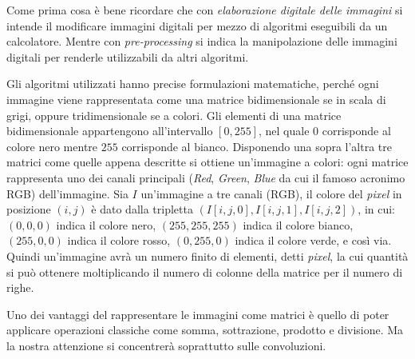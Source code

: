 Come prima cosa è bene ricordare che con \textit{elaborazione digitale delle immagini} si intende il modificare immagini digitali per mezzo di algoritmi eseguibili da un calcolatore.
Mentre con \textit{pre-processing} si indica la manipolazione delle immagini digitali per renderle utilizzabili da altri algoritmi.

Gli algoritmi utilizzati hanno precise formulazioni matematiche, perché ogni immagine viene rappresentata come una matrice bidimensionale se in scala di grigi, oppure tridimensionale se a colori.
Gli elementi di una matrice bidimensionale appartengono all'intervallo $[0,255]$, nel quale $0$ corrisponde al colore nero mentre $255$ corrisponde al bianco.
Disponendo una sopra l'altra tre matrici come quelle appena descritte si ottiene un'immagine a colori: ogni matrice rappresenta uno dei canali principali (\textit{Red}, \textit{Green}, \textit{Blue} da cui il famoso acronimo RGB) dell'immagine.
Sia $I$ un'immagine a tre canali (RGB), il colore del \textit{pixel} in posizione $(i,j)$ è dato dalla tripletta $(I[i,j,0], I[i,j,1], I[i,j,2])$, in cui: $(0,0,0)$ indica il colore nero, $(255,255,255)$ indica il colore bianco, $(255,0,0)$ indica il colore rosso, $(0,255,0)$ indica il colore verde, e così via.
Quindi un'immagine avrà un numero finito di elementi, detti \textit{pixel}, la cui quantità si può ottenere moltiplicando il numero di colonne della matrice per il numero di righe. %


Uno dei vantaggi del rappresentare le immagini come matrici è quello di poter applicare operazioni classiche come somma, sottrazione, prodotto e divisione.
Ma la nostra attenzione si concentrerà soprattutto sulle convoluzioni.

